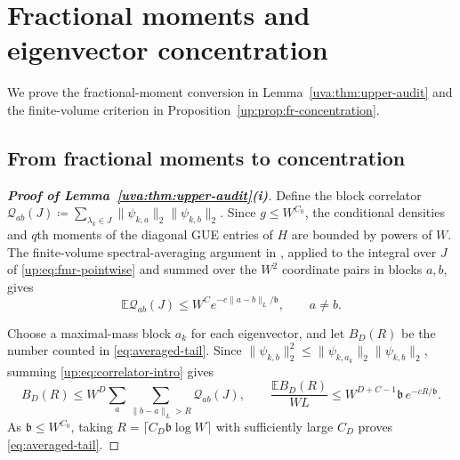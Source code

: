 \documentclass[11pt]{article}
\numberwithin{equation}{section}
\theoremstyle{remark}
\newcommand{\E}{\mathbb E}
\begin{document}
\section{Fractional moments and eigenvector concentration}
\label{app:strong-concentration}
We prove the fractional-moment conversion in
Lemma~\ref{uva:thm:upper-audit} and the finite-volume criterion in
Proposition~\ref{up:prop:fr-concentration}.

\subsection{From fractional moments to concentration}
\label{app:fr-concentration-proof}

\begin{proof}[\textbf{Proof of Lemma~\ref{uva:thm:upper-audit}\textup{(i)}}]
Define the block correlator
$\mathcal Q_{ab}(J)\coloneqq
\sum_{\lambda_k\in J}\|\psi_{k,a}\|_2\|\psi_{k,b}\|_2$.
Since $g\le W^{C_0}$, the conditional densities and $q$th moments
of the diagonal GUE entries of $H$ are bounded by powers of $W$.
The finite-volume spectral-averaging argument in
\cite[Appendix~A, proof of Theorem~A.1, (A.10)--(A.12)]{ASFH},
applied to the integral over $J$ of \eqref{up:eq:fmr-pointwise}
and summed over the $W^2$ coordinate pairs in blocks $a,b$, gives
\begin{equation}\label{up:eq:correlator-intro}
 \E\mathcal Q_{ab}(J)
 \le W^C e^{-c\|a-b\|_L/\mathfrak b},\qquad a\ne b.
\end{equation}

Choose a maximal-mass block $a_k$ for each eigenvector, and let
$B_D(R)$ be the number counted in \eqref{eq:averaged-tail}.
Since $\|\psi_{k,b}\|_2^2\le
\|\psi_{k,a_k}\|_2\|\psi_{k,b}\|_2$, summing
\eqref{up:eq:correlator-intro} gives
\begin{equation}\label{uv:eq:ordinary-count}
 B_D(R)\le W^D\sum_a\sum_{\|b-a\|_L>R}\mathcal Q_{ab}(J),\qquad
 \frac{\E B_D(R)}{WL}
 \le W^{D+C-1}\mathfrak b\,e^{-cR/\mathfrak b}.
\end{equation}
As $\mathfrak b\le W^{C_0}$, taking
$R=\lceil C_D\mathfrak b\log W\rceil$ with sufficiently large
$C_D$ proves \eqref{eq:averaged-tail}.
\end{proof}
\end{document}
